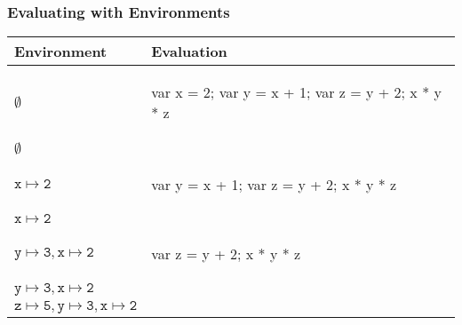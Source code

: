 \documentclass{beamer}
\begin{document}
\begin{frame}[fragile]
\frametitle{Evaluating with Environments}

\begin{tabular}{ll}
Environment & Evaluation
\\\hline\hline \pause
$\emptyset$
&
\begin{teenycode}
var x = 2;
var y = x + 1;
var z = y + 2;
x * y * z
\end{teenycode}
\\ \hline \pause
$\emptyset$
&
\begin{teenycode}
\end{teenycode}
\\ \hline \pause
$\mathtt{x \mapsto 2}$
&
\begin{teenycode}
var y = x + 1;
var z = y + 2;
x * y * z
\end{teenycode}
\\ \hline \pause
$\mathtt{x \mapsto 2}$
&
\begin{teenycode}
\end{teenycode}
\\ \hline \pause
$\mathtt{y \mapsto 3, x \mapsto 2}$
&
\begin{teenycode}
var z = y + 2;
x * y * z
\end{teenycode}
\\ \hline \pause
$\mathtt{y \mapsto 3, x \mapsto 2}$
&
\begin{teenycode}
\end{teenycode}
\\ \hline \pause
$\mathtt{z \mapsto 5, y \mapsto 3, x \mapsto 2}$
&
\begin{teenycode}
\end{teenycode}
\begin{teenycode}
\end{teenycode}
\end{tabular}
\vfill

\end{frame}
\end{document}
